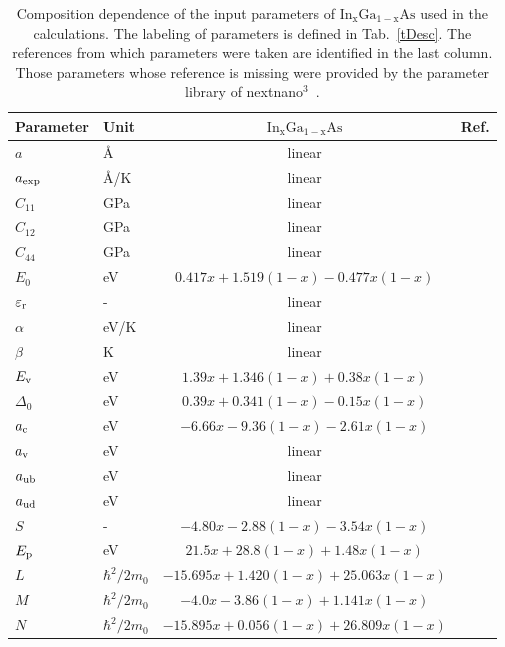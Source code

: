 
\begin{table*}[!ht]
	\caption{Composition dependence of the input parameters of $\mathrm{In_xGa_{1-x}As}$ used in the calculations. The labeling of parameters is defined in Tab.~\ref{tDesc}. The references from which parameters were taken are identified in the last column. Those parameters whose reference is missing were provided by the parameter library of nextnano$^3$~\cite{next}.\label{tSb3}
	}
	\begin{center}
		\begin{tabular}{llcc}
			\hline \hline
			Parameter & Unit & $\mathrm{In_xGa_{1-x}As}$ & Ref.\\
			\hline
			$a$ & \AA & linear & \\
			$a_{\rm exp}$ & \AA /K & linear & \\
			$C_{11}$ & GPa& linear &  \\
			$C_{12}$ & GPa& linear &  \\
			$C_{44}$ & GPa& linear & \\
			$E_0$ & eV & $0.417x+1.519(1-x)-0.477x(1-x)$ & \cite{Vurgaftman}\\
			$\varepsilon_{\rm r}$ & -& linear & \\
			$\alpha$ & eV/K & linear & \\
			$\beta$ & K & linear & \\
			$E_{\rm v}$ & eV & $1.39x+1.346(1-x)+0.38x(1-x)$& \cite{Vurgaftman}\\
			$\Delta_0$ & eV & $0.39x+0.341(1-x)-0.15x(1-x)$& \cite{Vurgaftman}\\
			$a_{\rm c}$ & eV & $-6.66x-9.36(1-x)-2.61x(1-x)$& \cite{Vurgaftman}\\
			$a_{\rm v}$ & eV & linear & \\
			$a_{\rm ub}$ & eV & linear& \\
			$a_{\rm ud}$ & eV & linear& \\
			$S$ & -& $-4.80x-2.88(1-x)-3.54x(1-x)$& \cite{Vurgaftman}\\
			$E_{\rm p}$ & eV & $21.5x+28.8(1-x)+1.48x(1-x)$& \cite{Vurgaftman}\\
			$L$ & $\hbar^2/2m_0$ & $-15.695x+1.420(1-x)+25.063x(1-x)$& \cite{Vurgaftman}\\
			$M$ & $\hbar^2/2m_0$ & $-4.0x-3.86(1-x)+1.141x(1-x)$& \cite{Vurgaftman}\\
			$N$ & $\hbar^2/2m_0$ & $-15.895x+0.056(1-x)+26.809x(1-x)$& \cite{Vurgaftman}\\
			\hline \hline
		\end{tabular}
	\end{center}
\end{table*}

\newpage 